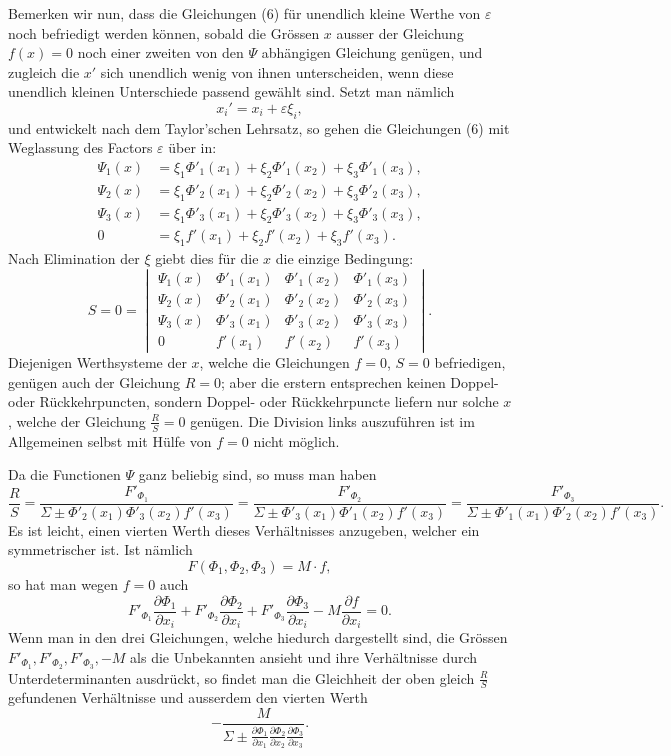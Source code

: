 \documentclass[10pt]{article}
\begin{document}
Bemerken wir nun, dass die Gleichungen (6) für unendlich kleine Werthe von \(\varepsilon\) noch befriedigt werden können, sobald die Grössen \(x\) ausser der Gleichung \(f(x)=0\) noch einer zweiten von den \(\Psi\) abhängigen Gleichung genügen, und zugleich die \(x'\) sich unendlich wenig von ihnen unterscheiden, wenn diese unendlich kleinen Unterschiede passend gewählt sind. Setzt man nämlich
\[
x_i'=x_i+\varepsilon\xi_i,
\]
und entwickelt nach dem Taylor'schen Lehrsatz, so gehen die Gleichungen (6) mit Weglassung des Factors \(\varepsilon\) über in:
\[
\begin{aligned}
\Psi_1(x)&=\xi_1\Phi'_1(x_1)+\xi_2\Phi'_1(x_2)+\xi_3\Phi'_1(x_3),\\
\Psi_2(x)&=\xi_1\Phi'_2(x_1)+\xi_2\Phi'_2(x_2)+\xi_3\Phi'_2(x_3),\\
\Psi_3(x)&=\xi_1\Phi'_3(x_1)+\xi_2\Phi'_3(x_2)+\xi_3\Phi'_3(x_3),\\
0&=\xi_1f'(x_1)+\xi_2f'(x_2)+\xi_3f'(x_3).
\end{aligned}
\]
Nach Elimination der \(\xi\) giebt dies für die \(x\) die einzige Bedingung:
\[
S=0=
\begin{vmatrix}
\Psi_1(x)&\Phi'_1(x_1)&\Phi'_1(x_2)&\Phi'_1(x_3)\\
\Psi_2(x)&\Phi'_2(x_1)&\Phi'_2(x_2)&\Phi'_2(x_3)\\
\Psi_3(x)&\Phi'_3(x_1)&\Phi'_3(x_2)&\Phi'_3(x_3)\\
0&f'(x_1)&f'(x_2)&f'(x_3)
\end{vmatrix}.
\]
Diejenigen Werthsysteme der \(x\), welche die Gleichungen \(f=0\), \(S=0\) befriedigen, genügen auch der Gleichung \(R=0\); aber die erstern entsprechen keinen Doppel- oder Rückkehrpuncten, sondern Doppel- oder Rückkehrpuncte liefern nur solche \(x\), welche der Gleichung \(\frac{R}{S}=0\) genügen. Die Division links auszuführen ist im Allgemeinen selbst mit Hülfe von \(f=0\) nicht möglich.

Da die Functionen \(\Psi\) ganz beliebig sind, so muss man haben
\[
\frac{R}{S}
=\frac{F'_{\Phi_1}}{\Sigma\pm\Phi'_2(x_1)\Phi'_3(x_2)f'(x_3)}
=\frac{F'_{\Phi_2}}{\Sigma\pm\Phi'_3(x_1)\Phi'_1(x_2)f'(x_3)}
=\frac{F'_{\Phi_3}}{\Sigma\pm\Phi'_1(x_1)\Phi'_2(x_2)f'(x_3)}.
\]
Es ist leicht, einen vierten Werth dieses Verhältnisses anzugeben, welcher ein symmetrischer ist. Ist nämlich
\[
F(\Phi_1,\Phi_2,\Phi_3)=M\cdot f,
\]
so hat man wegen \(f=0\) auch
\[
F'_{\Phi_1}\frac{\partial\Phi_1}{\partial x_i}
+F'_{\Phi_2}\frac{\partial\Phi_2}{\partial x_i}
+F'_{\Phi_3}\frac{\partial\Phi_3}{\partial x_i}
-M\frac{\partial f}{\partial x_i}=0.
\]
Wenn man in den drei Gleichungen, welche hiedurch dargestellt sind, die Grössen \(F'_{\Phi_1},F'_{\Phi_2},F'_{\Phi_3},-M\) als die Unbekannten ansieht und ihre Verhältnisse durch Unterdeterminanten ausdrückt, so findet man die Gleichheit der oben gleich \(\frac{R}{S}\) gefundenen Verhältnisse und ausserdem den vierten Werth
\[
-\frac{M}{\Sigma\pm
\frac{\partial\Phi_1}{\partial x_1}
\frac{\partial\Phi_2}{\partial x_2}
\frac{\partial\Phi_3}{\partial x_3}}.
\]
\end{document}
